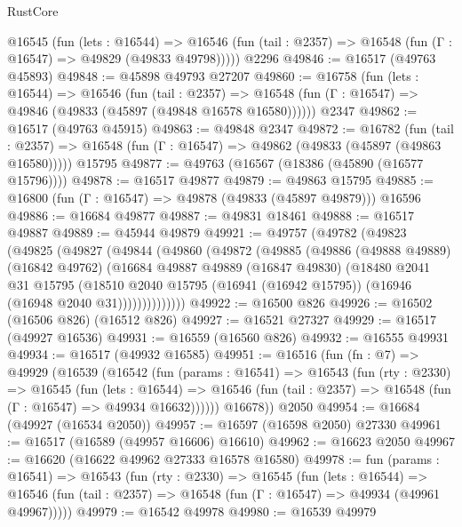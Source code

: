 \begin{lexlean}{RustCore}
\begin{coremodule}
    @16545
      (fun (lets : @16544) =>
      @16546 (fun (tail : @2357) => @16548 (fun (Γ : @16547) => @49829 (@49833 @49798)))))
    @2296
@49846 := @16517 (@49763 @45893)
@49848 := @45898 @49793 @27207
@49860 := @16758
    (fun (lets : @16544) =>
    @16546
      (fun (tail : @2357) =>
      @16548 (fun (Γ : @16547) => @49846 (@49833 (@45897 (@49848 @16578 @16580))))))
    @2347
@49862 := @16517 (@49763 @45915)
@49863 := @49848 @2347
@49872 := @16782
    (fun (tail : @2357) => @16548 (fun (Γ : @16547) => @49862 (@49833 (@45897 (@49863 @16580)))))
    @15795
@49877 := @49763 (@16567 (@18386 (@45890 (@16577 @15796))))
@49878 := @16517 @49877
@49879 := @49863 @15795
@49885 := @16800 (fun (Γ : @16547) => @49878 (@49833 (@45897 @49879))) @16596
@49886 := @16684 @49877
@49887 := @49831 @18461
@49888 := @16517 @49887
@49889 := @45944 @49879
@49921 := @49757
    (@49782
      (@49823
        (@49825
          (@49827
            (@49844
              (@49860
                (@49872
                  (@49885
                    (@49886
                      (@49888 @49889)
                      (@16842 @49762)
                      (@16684
                        @49887
                        @49889
                        (@16847 @49830)
                        (@18480
                          @2041
                          @31
                          @15795
                          (@18510
                            @2040
                            @15795
                            (@16941 (@16942 @15795))
                            (@16946 (@16948 @2040 @31))))))))))))))
@49922 := @16500 @826
@49926 := @16502 (@16506 @826) (@16512 @826)
@49927 := @16521 @27327
@49929 := @16517 (@49927 @16536)
@49931 := @16559 (@16560 @826)
@49932 := @16555 @49931
@49934 := @16517 (@49932 @16585)
@49951 := @16516
    (fun (fn : @7) =>
    @49929
      (@16539
        (@16542
          (fun (params : @16541) =>
          @16543
            (fun (rty : @2330) =>
            @16545
              (fun (lets : @16544) =>
              @16546 (fun (tail : @2357) => @16548 (fun (Γ : @16547) => @49934 @16632))))))
        @16678))
    @2050
@49954 := @16684 (@49927 (@16534 @2050))
@49957 := @16597 (@16598 @2050) @27330
@49961 := @16517 (@16589 (@49957 @16606) @16610)
@49962 := @16623 @2050
@49967 := @16620 (@16622 @49962 @27333 @16578 @16580)
@49978 := fun (params : @16541) =>
  @16543
    (fun (rty : @2330) =>
    @16545
      (fun (lets : @16544) =>
      @16546 (fun (tail : @2357) => @16548 (fun (Γ : @16547) => @49934 (@49961 @49967)))))
@49979 := @16542 @49978
@49980 := @16539 @49979

\end{coremodule}
\end{lexlean}
